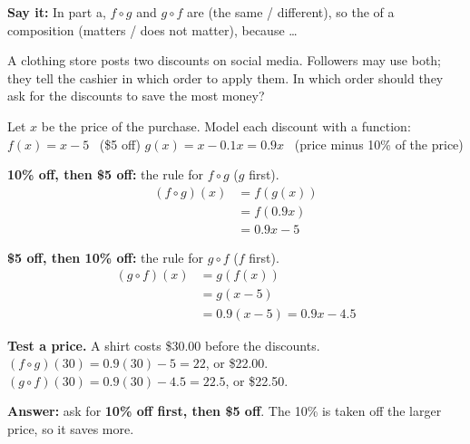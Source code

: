 \vspace{8pt}
\textbf{Say it:} In part a, $f\circ g$ and $g\circ f$ are \blank[2.2cm] (the same / different), so the \blank[2cm] of a composition \blank[2.2cm] (matters / does not matter), because \dots\lines[3]

\newpage

A clothing store posts two discounts on social media. Followers may use both; they tell the cashier in which order to apply them. In which order should they ask for the discounts to save the most money?

\noindent{}\hfill
{}\par

Let $x$ be the price of the purchase. Model each discount with a function:\\
\hspace*{1.5em}$f(x)=x-5$ \ (\$5 off) \qquad $g(x)=x-0.1x=0.9x$ \ (price minus 10\% of the price)

\begin{minipage}[t]{0.48\textwidth}
\textbf{10\% off, then \$5 off:} the rule for $f\circ g$ ($g$ first).
\begin{align*}
(f\circ g)(x)&=f(g(x))\\
&=f(0.9x)\\
&=0.9x-5
\end{align*}
\end{minipage}\hfill
\begin{minipage}[t]{0.48\textwidth}
\textbf{\$5 off, then 10\% off:} the rule for $g\circ f$ ($f$ first).
\begin{align*}
(g\circ f)(x)&=g(f(x))\\
&=g(x-5)\\
&=0.9(x-5)=0.9x-4.5
\end{align*}
\end{minipage}

\textbf{Test a price.} A shirt costs \$30.00 before the discounts.\\
$(f\circ g)(30)=0.9(30)-5=22$, or \$22.00. \qquad $(g\circ f)(30)=0.9(30)-4.5=22.5$, or \$22.50.

\textbf{Answer:} ask for \textbf{10\% off first, then \$5 off}. The 10\% is taken off the larger price, so it saves more.

